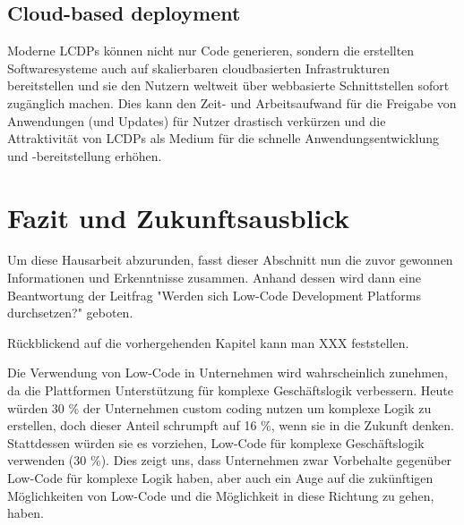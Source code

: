 \documentclass[12pt]{article} %
\begin{document}
	
	\subsection{Cloud-based deployment}
	Moderne LCDPs können nicht nur Code generieren, sondern die erstellten Softwaresysteme auch auf skalierbaren cloudbasierten Infrastrukturen bereitstellen und sie den Nutzern weltweit über webbasierte Schnittstellen sofort zugänglich machen. Dies kann den Zeit- und Arbeitsaufwand für die Freigabe von Anwendungen (und Updates) für Nutzer drastisch verkürzen und die Attraktivität von LCDPs als Medium für die schnelle Anwendungsentwicklung und -bereitstellung erhöhen. \cite{DiRuscio.2022}
	
	
	
	
	
	
	\section{Fazit und Zukunftsausblick}
	Um diese Hausarbeit abzurunden, fasst dieser Abschnitt nun die zuvor gewonnen Informationen und Erkenntnisse zusammen. Anhand dessen wird dann eine Beantwortung der Leitfrag "Werden sich Low-Code Development Platforms durchsetzen?" geboten. \newline
	
	Rückblickend auf die vorhergehenden Kapitel kann man XXX feststellen.
	
	
	
	
	Die Verwendung von Low-Code in Unternehmen wird wahrscheinlich zunehmen, da die Plattformen
	Unterstützung für komplexe Geschäftslogik verbessern. Heute würden 30 \% der Unternehmen custom coding nutzen um komplexe Logik zu erstellen, doch dieser Anteil schrumpft auf 16 \%, wenn sie in die Zukunft denken. Stattdessen würden sie es vorziehen, Low-Code für komplexe Geschäftslogik verwenden (30 \%). Dies zeigt uns, dass Unternehmen zwar Vorbehalte gegenüber Low-Code für komplexe Logik haben, aber auch ein Auge auf die zukünftigen Möglichkeiten von Low-Code und
	die Möglichkeit in diese Richtung zu gehen, haben. \cite{EmmaVanPelt.2019}
	
	\newpage	
	\printbibliography[title={\section{Referenzen}}] %
	
\end{document}
